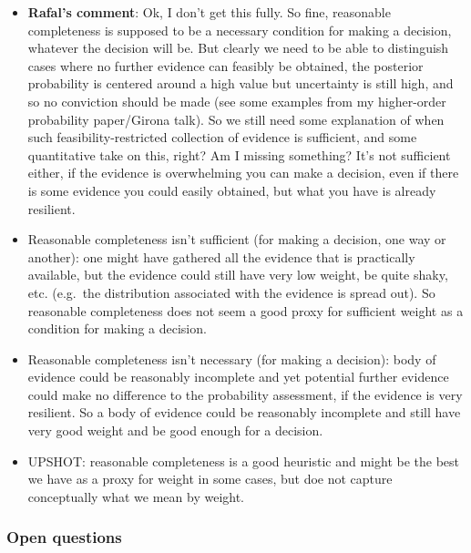 \documentclass[
  10pt,
  dvipsnames,enabledeprecatedfontcommands]{scrartcl}
\begin{document}
\begin{itemize}
\item
  \textbf{Rafal's comment}: Ok, I don't get this fully. So fine,
  reasonable completeness is supposed to be a necessary condition for
  making a decision, whatever the decision will be. But clearly we need
  to be able to distinguish cases where no further evidence can feasibly
  be obtained, the posterior probability is centered around a high value
  but uncertainty is still high, and so no conviction should be made
  (see some examples from my higher-order probability paper/Girona
  talk). So we still need some explanation of when such
  feasibility-restricted collection of evidence is sufficient, and some
  quantitative take on this, right? Am I missing something? It's not
  sufficient either, if the evidence is overwhelming you can make a
  decision, even if there is some evidence you could easily obtained,
  but what you have is already resilient.
\item
  Reasonable completeness isn't sufficient (for making a decision, one
  way or another): one might have gathered all the evidence that is
  practically available, but the evidence could still have very low
  weight, be quite shaky, etc. (e.g.~the distribution associated with
  the evidence is spread out). So reasonable completeness does not seem
  a good proxy for sufficient weight as a condition for making a
  decision.
\item
  Reasonable completeness isn't necessary (for making a decision): body
  of evidence could be reasonably incomplete and yet potential further
  evidence could make no difference to the probability assessment, if
  the evidence is very resilient. So a body of evidence could be
  reasonably incomplete and still have very good weight and be good
  enough for a decision.
\item
  UPSHOT: reasonable completeness is a good heuristic and might be the
  best we have as a proxy for weight in some cases, but doe not capture
  conceptually what we mean by weight.
\end{itemize}


\hypertarget{open-questions}{%
\subsubsection{Open questions}\label{open-questions}}
\end{document}
